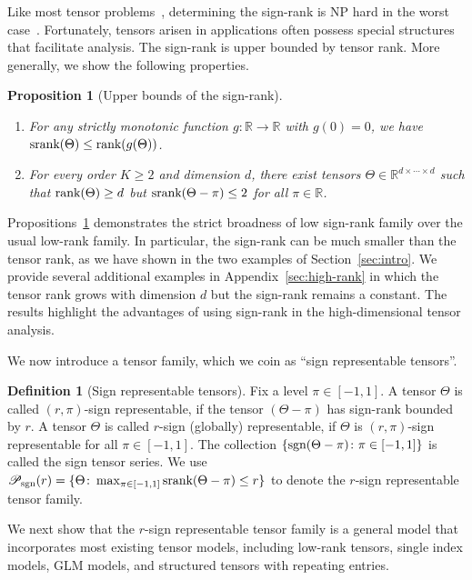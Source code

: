 \documentclass{article}
\theoremstyle{plain}
\newtheorem{prop}{Proposition}
\theoremstyle{definition}
\newtheorem{defn}{Definition}
\def\sign{\textup{sgn}}
\def\srank{\textup{srank}}
\def\rank{\textup{rank}}
\def\caliP{\mathscr{P}_{\textup{sgn}}}
\begin{document}
Like most tensor problems~\citep{hillar2013most}, determining the sign-rank is NP hard in the worst case~\citep{alon2016sign}. Fortunately, tensors arisen in applications often possess special structures that facilitate analysis. The sign-rank is upper bounded by tensor rank. More generally, we show the following properties.
\vspace{.1cm}
\begin{prop}[Upper bounds of the sign-rank]~\label{cor:monotonic} \hfill
\begin{enumerate}[label={2.\arabic*},wide, labelwidth=!, labelindent=0pt,itemsep=0ex,parsep=0ex,topsep=-7pt]
\item[(a)] [Upper bounds] For any strictly monotonic function $g\colon \mathbb{R}\to \mathbb{R}$ with $g(0)=0$,  we have $\textup{srank}(\Theta)\leq\rank(g(\Theta))$.
\item[(b)] [Broadness] For every order $K\geq 2$ and dimension $d$, there exist tensors $\Theta\in\mathbb{R}^{d\times \cdots \times d}$ such that $\rank(\Theta)\geq d$ but $\srank(\Theta-\pi)\leq 2$ for all $\pi\in\mathbb{R}$.  
\end{enumerate}
\end{prop}
Propositions~\ref{cor:monotonic} demonstrates the strict broadness of low sign-rank family over the usual low-rank family. 
In particular, the sign-rank can be much smaller than the tensor rank, as we have shown in the two examples of Section~\ref{sec:intro}. We provide several additional examples in Appendix~\ref{sec:high-rank} in which the tensor rank grows with dimension $d$ but the sign-rank remains a constant. The results highlight the advantages of using sign-rank in the high-dimensional tensor analysis. 

We now introduce a tensor family, which we coin as ``sign representable tensors''.
\vspace{.05cm}
\begin{defn}[Sign representable tensors] 
Fix a level $\pi\in[-1,1]$. A tensor $\Theta$ is called $(r,\pi)$-sign representable, if the tensor $(\Theta-\pi)$ has sign-rank bounded by $r$. A tensor $\Theta$ is called $r$-sign (globally) representable, if $\Theta$ is $(r,\pi)$-sign representable for all $\pi\in[-1,1]$. The collection $\{\sign(\Theta-\pi)\colon \pi \in[-1,1]\}$ is called the sign tensor series. 
We use $\caliP(r)=\{\Theta\colon \max_{\pi\in[-1,1]}\srank(\Theta-\pi)\leq r\}$ to denote the $r$-sign representable tensor family.
\end{defn}

We next show that the $r$-sign representable tensor family is a general model that incorporates most existing tensor models, including low-rank tensors, single index models, GLM models, and structured tensors with repeating entries. 
\end{document}
